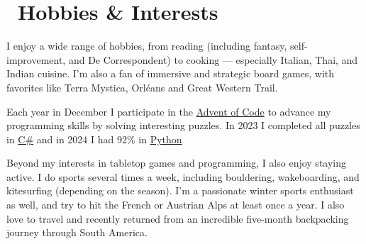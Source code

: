 \vspace{0.4em}
\section{\faCoffee\ Hobbies \& Interests}
I enjoy a wide range of hobbies, from reading (including fantasy, self-improvement, and De Correspondent) to cooking — especially Italian, Thai, and Indian cuisine.  I’m also a fan of immersive and strategic board games, with favorites like Terra Mystica, Orl\'{e}ans and Great Western Trail.

Each year in December I participate in the \href{https://adventofcode.com/}{Advent of Code} to advance my programming skills by solving interesting puzzles. In 2023
I completed all puzzles in \href{https://github.com/cdijkstra/AdventOfCode2023}{C\#} and in 2024 I had 92\% in \href{https://github.com/cdijkstra/AdventOfCode2024}{Python}

Beyond my interests in tabletop games and programming, I also enjoy staying active. I do sports several times a week, including bouldering, wakeboarding, and kitesurfing (depending on the season). I'm a passionate winter sports enthusiast as well, and try to hit the French or Austrian Alps at least once a year. I also love to travel and recently returned from an incredible five-month backpacking journey through South America.
